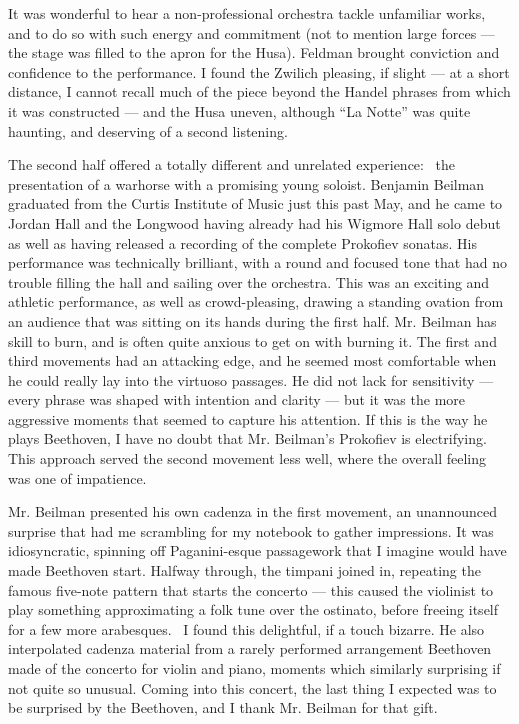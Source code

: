 It was wonderful to hear a non-professional orchestra tackle unfamiliar works, and to do so with such energy and commitment (not to mention large forces — the stage was filled to the apron for the Husa). Feldman brought conviction and confidence to the performance. I found the Zwilich pleasing, if slight — at a short distance, I cannot recall much of the piece beyond the Handel phrases from which it was constructed — and the Husa uneven, although “La Notte” was quite haunting, and deserving of a second listening.

The second half offered a totally different and unrelated experience:  the presentation of a warhorse with a promising young soloist. Benjamin Beilman graduated from the Curtis Institute of Music just this past May, and he came to Jordan Hall and the Longwood having already had his Wigmore Hall solo debut as well as having released a recording of the complete Prokofiev sonatas. His performance was technically brilliant, with a round and focused tone that had no trouble filling the hall and sailing over the orchestra. This was an exciting and athletic performance, as well as crowd-pleasing, drawing a standing ovation from an audience that was sitting on its hands during the first half. Mr. Beilman has skill to burn, and is often quite anxious to get on with burning it. The first and third movements had an attacking edge, and he seemed most comfortable when he could really lay into the virtuoso passages. He did not lack for sensitivity — every phrase was shaped with intention and clarity — but it was the more aggressive moments that seemed to capture his attention. If this is the way he plays Beethoven, I have no doubt that Mr. Beilman’s Prokofiev is electrifying. This approach served the second movement less well, where the overall feeling was one of impatience.

Mr. Beilman presented his own cadenza in the first movement, an unannounced surprise that had me scrambling for my notebook to gather impressions. It was idiosyncratic, spinning off Paganini-esque passagework that I imagine would have made Beethoven start. Halfway through, the timpani joined in, repeating the famous five-note pattern that starts the concerto — this caused the violinist to play something approximating a folk tune over the ostinato, before freeing itself for a few more arabesques.  I found this delightful, if a touch bizarre. He also interpolated cadenza material from a rarely performed arrangement Beethoven made of the concerto for violin and piano, moments which similarly surprising if not quite so unusual. Coming into this concert, the last thing I expected was to be surprised by the Beethoven, and I thank Mr. Beilman for that gift.
